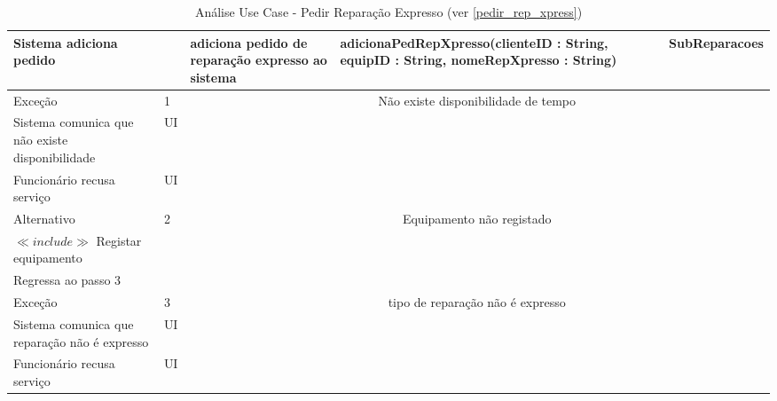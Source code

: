 \documentclass[../relatorio.tex]{subfiles}
\begin{document}
\begin{landscape}
\begin{table}[!h]
\begin{tabular}{|p{5cm}|p{1cm}|p{4cm}|p{6cm}|p{3cm}|}
            \\
            \hline
            Sistema adiciona pedido
                     & 
                     & adiciona pedido de reparação expresso ao sistema
                     & adicionaPedRepXpresso(clienteID : String, equipID : String, nomeRepXpresso : String)
                     & SubReparacoes
            \\
            \hline
            \rowcolor{red!30}
            Exceção  & 1                                               &  \multicolumn{3}{c}{Não existe disponibilidade de tempo}\\
            \hline
            \rowcolor{yellow}
            Sistema comunica que não existe disponibilidade
                     & UI
                     & 
                     & 
                     & 
            \\
            \hline
            Funcionário recusa serviço
                     & UI
                     & 
                     & 
                     & 
            \\
            \hline
            \rowcolor{green!30}
            Alternativo  & 2                                               &  \multicolumn{3}{c}{Equipamento não registado}\\
            \hline
            $\ll include \gg$ Registar equipamento
                     & 
                     & 
                     & 
                     & 
            \\
            \hline
            Regressa ao passo 3
                     & 
                     & 
                     & 
                     & 
            \\
            \hline
            \rowcolor{red!30}
            Exceção  & 3                                               &  \multicolumn{3}{c}{tipo de reparação não é expresso}\\
            \hline
            \rowcolor{yellow}
            Sistema comunica que reparação não é expresso
                     & UI
                     & 
                     & 
                     & 
            \\
            \hline
            Funcionário recusa serviço
                     & UI
                     & 
                     & 
                     & 
            \\
            \hline
        \end{tabular}
        \caption{Análise Use Case - Pedir Reparação Expresso (ver \ref{pedir_rep_xpress})}
    \end{table}
\end{landscape}
\end{document}
